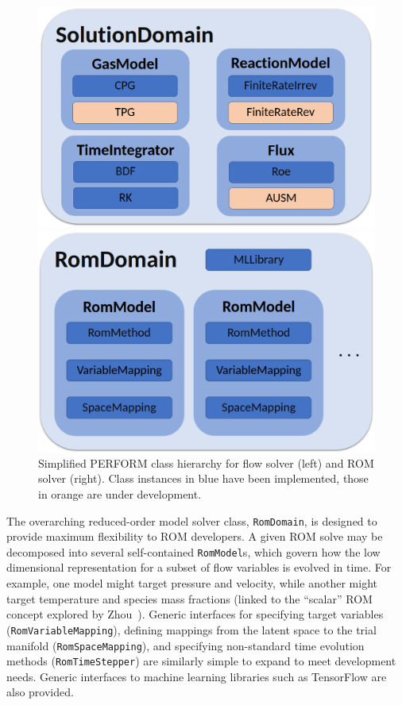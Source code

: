 \begin{figure}
	\begin{minipage}{0.49\linewidth}
		\includegraphics[width=0.99\linewidth]{Chapters/TransientFlame/Images/performFOMAPI.png}
	\end{minipage}
	\begin{minipage}{0.49\linewidth}
		\includegraphics[width=0.99\linewidth]{Chapters/TransientFlame/Images/performROMAPI.png}
	\end{minipage}
	\caption{\label{fig:performAPI}Simplified PERFORM class hierarchy for flow solver (left) and ROM solver (right). Class instances in blue have been implemented, those in orange are under development.}
\end{figure}

The overarching reduced-order model solver class, \texttt{RomDomain}, is designed to provide maximum flexibility to ROM developers. A given ROM solve may be decomposed into several self-contained \texttt{RomModel}s, which govern how the low dimensional representation for a subset of flow variables is evolved in time. For example, one model might target pressure and velocity, while another might target temperature and species mass fractions (linked to the ``scalar'' ROM concept explored by Zhou~\cite{Zhou2012}). Generic interfaces for specifying target variables (\texttt{RomVariableMapping}), defining mappings from the latent space to the trial manifold (\texttt{RomSpaceMapping}), and specifying non-standard time evolution methods (\texttt{RomTimeStepper}) are similarly simple to expand to meet development needs. Generic interfaces to machine learning libraries such as TensorFlow are also provided.

